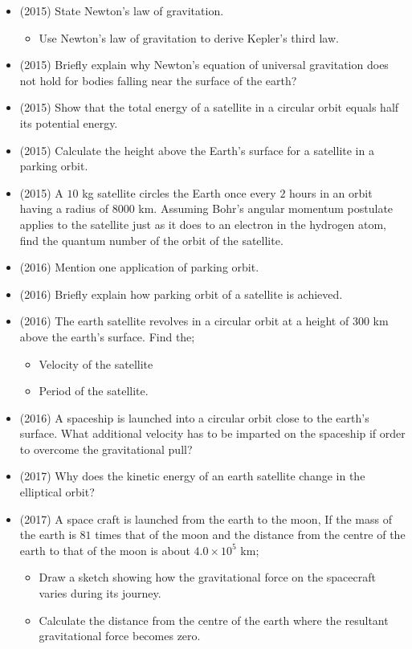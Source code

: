 \documentclass{article}
\begin{document}
\begin{itemize}
\item (2015)  State Newton's law of gravitation. 
 \begin{itemize}
\item Use Newton’s law of gravitation to derive Kepler’s third law.
\end{itemize}
\item (2015)  Briefly explain why Newton’s equation of universal gravitation does not hold for bodies falling near the surface of the earth? 
\item (2015)  Show that the total energy of a satellite in a circular orbit equals half its potential energy.
\item (2015)  Calculate the height above the Earth’s surface for a satellite in a parking orbit.
\item (2015)  A $ 10$ kg satellite circles the Earth once every $ 2$ hours in an orbit having a radius of $ 8000$ km.  Assuming Bohr’s angular momentum postulate applies to the satellite just as it does to an electron in the hydrogen atom,  find the quantum number of the orbit of the satellite.
\item (2016)  Mention one application of parking orbit.
\item (2016)  Briefly explain how parking orbit of a satellite is achieved.
\item (2016)  The earth satellite revolves in a circular orbit at a height of $ 300$ km above the earth’s surface.  Find the; 
 \begin{itemize}
\item Velocity of the satellite
\item Period of the satellite.
\end{itemize}
\item (2016)  A spaceship is launched into a circular orbit close to the earth’s surface.  What additional velocity has to be imparted on the spaceship if order to overcome the gravitational pull?
\item (2017)  Why does the kinetic energy of an earth satellite change in the elliptical orbit?
\item (2017)  A space craft is launched from the earth to the moon, If the mass of the earth is $ 81$ times that of the moon and the distance from the centre of the earth to that of the moon is about $ 4.0 \times 10^{5}$ km;
 \begin{itemize}
\item Draw a sketch showing how the gravitational force on the spacecraft varies during its journey. 
\item Calculate the distance from the centre of the earth where the resultant gravitational force becomes zero. 

\end{itemize}
\end{itemize}
\end{document}
